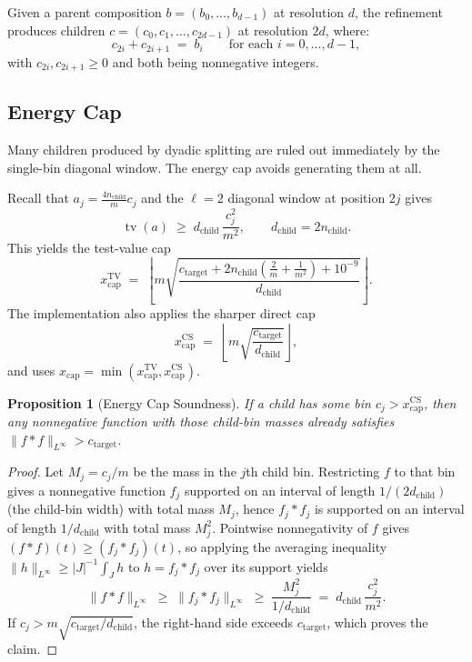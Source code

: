 \documentclass[11pt, letterpaper]{article}
\theoremstyle{paperplain}
\newtheorem{proposition}[theorem]{Proposition}
\theoremstyle{paperdef}
\newcommand{\tv}{\operatorname{tv}}
\begin{document}
Given a parent composition $b = (b_0, \ldots, b_{d-1})$ at resolution
$d$, the refinement produces children $c = (c_0, c_1, \ldots,
c_{2d-1})$ at resolution $2d$, where:
\[
  c_{2i} + c_{2i+1} \;=\; b_i \qquad \text{for each } i = 0, \ldots, d-1,
\]
with $c_{2i}, c_{2i+1} \ge 0$ and both being nonnegative integers.

\subsection{Energy Cap}\label{subsec:energy-cap}

Many children produced by dyadic splitting are ruled out immediately
by the single-bin diagonal window.  The energy cap avoids generating
them at all.

Recall that $a_j = \tfrac{4n_{\mathrm{child}}}{m}c_j$ and the $\ell = 2$ diagonal window at
position $2j$ gives
\[
  \tv(a) \;\ge\; d_{\mathrm{child}}\,\frac{c_j^2}{m^2},
  \qquad d_{\mathrm{child}} = 2n_{\mathrm{child}}.
\]
This yields the test-value cap
\[
  x_{\mathrm{cap}}^{\mathrm{TV}}
  \;=\;
  \left\lfloor
    m \sqrt{\frac{c_{\mathrm{target}} +
      2n_{\mathrm{child}}\left(\tfrac{2}{m} + \tfrac{1}{m^2}\right)
      + 10^{-9}}
    {d_{\mathrm{child}}}}
  \right\rfloor.
\]
The implementation also applies the sharper direct cap
\[
  x_{\mathrm{cap}}^{\mathrm{CS}}
  \;=\;
  \left\lfloor
    m \sqrt{\frac{c_{\mathrm{target}}}{d_{\mathrm{child}}}}
  \right\rfloor,
\]
and uses
$x_{\mathrm{cap}} = \min\!\left(x_{\mathrm{cap}}^{\mathrm{TV}},
x_{\mathrm{cap}}^{\mathrm{CS}}\right)$.

\begin{proposition}[Energy Cap Soundness]
\label{prop:energy-cap-sound}
If a child has some bin $c_j > x_{\mathrm{cap}}^{\mathrm{CS}}$, then
any nonnegative function with those child-bin masses already satisfies
$\|f*f\|_{L^\infty} > c_{\mathrm{target}}$.
\end{proposition}

\begin{proof}
Let $M_j = c_j/m$ be the mass in the $j$th child bin.  Restricting $f$
to that bin gives a nonnegative function $f_j$ supported on an
interval of length $1/(2 d_{\mathrm{child}})$ (the child-bin width)
with total mass $M_j$, hence $f_j*f_j$ is supported on an interval of
length $1/d_{\mathrm{child}}$ with total mass $M_j^2$.  Pointwise
nonnegativity of $f$ gives $(f*f)(t)\ge (f_j*f_j)(t)$, so applying
the averaging inequality
$\|h\|_{L^\infty}\ge |J|^{-1}\int_J h$ to $h=f_j*f_j$ over its
support yields
\[
  \|f*f\|_{L^\infty}
  \;\ge\;
  \|f_j*f_j\|_{L^\infty}
  \;\ge\;
  \frac{M_j^2}{1/d_{\mathrm{child}}}
  \;=\;
  d_{\mathrm{child}}\,\frac{c_j^2}{m^2}.
\]
If
$c_j > m \sqrt{c_{\mathrm{target}}/d_{\mathrm{child}}}$,
the right-hand side exceeds $c_{\mathrm{target}}$, which proves the
claim.
\end{proof}
\end{document}
